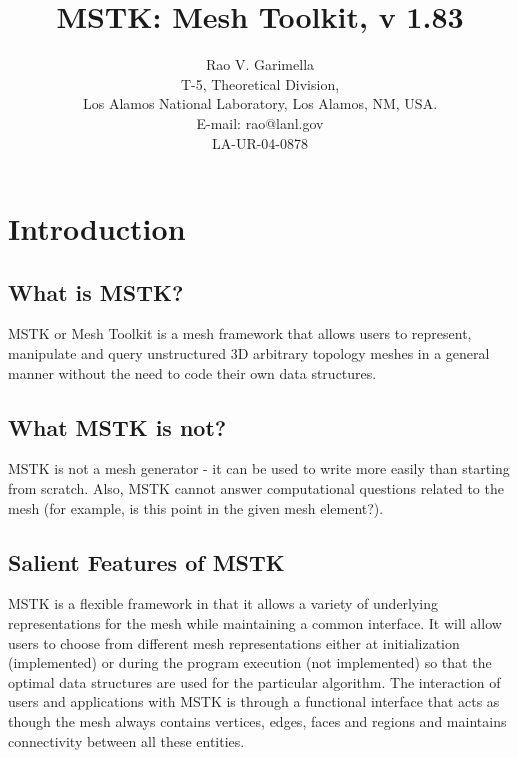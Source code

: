 \documentclass[12pt]{article}
\begin{document}
\title{MSTK: Mesh Toolkit, v 1.83} 


\author{Rao V. Garimella \\
  T-5, Theoretical Division, \\
  Los Alamos National Laboratory, Los Alamos, NM, USA. \\ E-mail:
  rao@lanl.gov \\
  \vspace{5em}
  LA-UR-04-0878}

\maketitle

\thispagestyle{empty}
\setlength{\parindent}{0.0in}
\setlength{\parskip}{0.5em}

\newpage
\section{Introduction}

\subsection{What is MSTK?}
MSTK or Mesh Toolkit is a mesh framework that allows users to
represent, manipulate and query unstructured 3D arbitrary topology
meshes in a general manner without the need to code their own data
structures. 

\subsection{What MSTK is not?}

MSTK is not a mesh generator - it can be used to write more easily
than starting from scratch. Also, MSTK cannot answer computational
questions related to the mesh (for example, is this point in the given
mesh element?).

\subsection{Salient Features of MSTK}

MSTK is a flexible framework in that it allows a variety
of underlying representations for the mesh while maintaining a common
interface. It will allow users to choose from different mesh
representations either at initialization (implemented) or during the
program execution (not implemented) so that the optimal data
structures are used for the particular algorithm. The interaction of
users and applications with MSTK is through a functional interface
that acts as though the mesh always contains vertices, edges, faces
and regions and maintains connectivity between all these entities.
\end{document}
